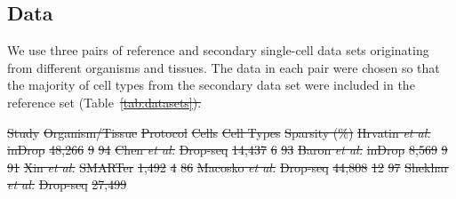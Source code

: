 \documentclass[runningheads]{llncs}
\newcommand{\etal}{\textit{et al.}}
\providecommand{\DIFdel}[1]{{\protect\color{red}\sout{#1}}}                      %
\providecommand{\DIFdelbegin}{} %
\providecommand{\DIFdelFL}[1]{\DIFdel{#1}} %
\newcommand{\DIFscaledelfig}{0.5}
\newlength{\DIFdelgraphicswidth} %
\newlength{\DIFdelgraphicsheight} %
\newcommand{\DIFdelincludegraphics}[2][]{%
\sbox{\DIFdelgraphicsbox}{\DIFOincludegraphics[#1]{#2}}%
\settoboxwidth{\DIFdelgraphicswidth}{\DIFdelgraphicsbox} %
\settoboxtotalheight{\DIFdelgraphicsheight}{\DIFdelgraphicsbox} %
\scalebox{\DIFscaledelfig}{%
\parbox[b]{\DIFdelgraphicswidth}{\usebox{\DIFdelgraphicsbox}\\[-\baselineskip] \rule{\DIFdelgraphicswidth}{0em}}\llap{\resizebox{\DIFdelgraphicswidth}{\DIFdelgraphicsheight}{%
\setlength{\unitlength}{\DIFdelgraphicswidth}%
\begin{picture}(1,1)%
\thicklines\linethickness{2pt} %
{\color[rgb]{1,0,0}\put(0,0){\framebox(1,1){}}}%
{\color[rgb]{1,0,0}\put(0,0){\line( 1,1){1}}}%
{\color[rgb]{1,0,0}\put(0,1){\line(1,-1){1}}}%
\end{picture}%
}\hspace*{3pt}}} %
} %
\DeclareRobustCommand{\DIFdelbegin}{\DIFOdelbegin \let\includegraphics\DIFdelincludegraphics} %
\begin{document}
\subsection{Data}

We use three pairs of reference and secondary single-cell data sets originating
from different organisms and tissues. The data in each pair were chosen so that
the majority of cell types from the secondary data set were included in the
reference set (Table~\DIFdelbegin \DIFdel{\ref{tab:datasets}).
}%

\DIFdelFL{Study }%
\DIFdelFL{Organism/Tissue }%
\DIFdelFL{Protocol }%
\DIFdelFL{Cells }%
\DIFdelFL{Cell Types }%
\DIFdelFL{Sparsity (\%) }%
\DIFdelFL{Hrvatin \etal }%
\DIFdelFL{inDrop }%
\DIFdelFL{48,266 }%
\DIFdelFL{9 }%
\DIFdelFL{94 }%
\DIFdelFL{Chen \etal }%
\DIFdelFL{Drop-seq }%
\DIFdelFL{14,437 }%
\DIFdelFL{6 }%
\DIFdelFL{93 }%
\DIFdelFL{Baron \etal }%
\DIFdelFL{inDrop }%
\DIFdelFL{8,569 }%
\DIFdelFL{9 }%
\DIFdelFL{91 }%
\DIFdelFL{Xin \etal }%
\DIFdelFL{SMARTer }%
\DIFdelFL{1,492 }%
\DIFdelFL{4 }%
\DIFdelFL{86 }%
\DIFdelFL{Macosko \etal }%
\DIFdelFL{Drop-seq }%
\DIFdelFL{44,808 }%
\DIFdelFL{12 }%
\DIFdelFL{97 }%
\DIFdelFL{Shekhar \etal }%
\DIFdelFL{Drop-seq }%
\DIFdelFL{27,499 }%
\end{document}

